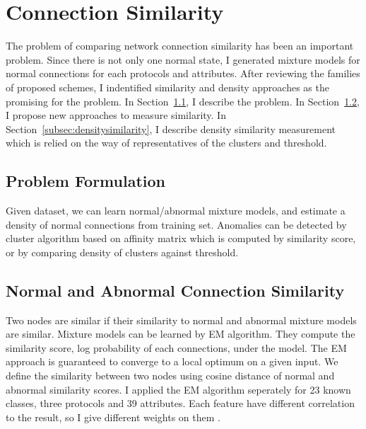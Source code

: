 \section{Connection Similarity}
\label{sec:connectionsimilarity}
The problem of comparing network connection similarity has been an important problem. %
Since there is not only one normal state, I generated mixture models for normal connections for each protocols and attributes.
After reviewing the families of proposed schemes, I indentified similarity and density approaches as the promising for the problem.
\newline
In Section~\ref{subsec:problemformulation}, I describe the problem.\newline
In Section~\ref{subsec:normalabnormalsimilarity}, I propose new approaches to measure similarity.\newline
In Section~\ref{subsec:densitysimilarity}, I describe density similarity measurement which is relied on the way of representatives of the clusters and threshold.\newline

\subsection{Problem Formulation}
\label{subsec:problemformulation}
Given dataset, we can learn normal/abnormal mixture models, and estimate a density of normal connections from training set.
Anomalies can be detected by cluster algorithm based on affinity matrix which is computed by similarity score, or by comparing density of clusters against threshold.

\subsection{Normal and Abnormal Connection Similarity}
\label{subsec:normalabnormalsimilarity}
Two nodes are similar if their similarity to normal and abnormal mixture models are similar. 
Mixture models can be learned by EM algorithm. 
They compute the similarity score, log probability of each connections, under the model. 
The EM approach is guaranteed to converge to a local optimum on a given input. 
We define the similarity between two nodes using cosine distance of normal and abnormal similarity scores. 
I applied the EM algorithm seperately for 23 known classes, three protocols and 39 attributes. 
Each feature have different correlation to the result, so I give different weights on them \cite{olusola10}\cite{kayacik05}.

